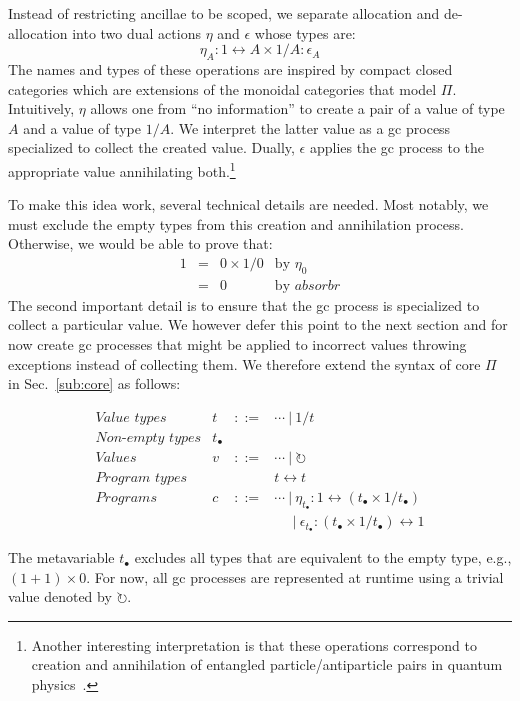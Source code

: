 \documentclass[sigplan,10pt,review,anonymous]{acmart}
\newcommand{\alt}{~|~}
\newcommand{\net}{t_\bullet}
\newcommand{\gcv}{\circlearrowright}
\newcommand{\oneover}[1]{1/#1}
\newcommand{\absorbr}{\mathit{absorbr}}
\begin{document}
Instead of restricting ancillae to be scoped, we separate allocation
and de-allocation into two dual actions $\eta$ and $\epsilon$ whose
types are:
\[
\eta_A : 1 \leftrightarrow A \times \oneover{A} : \epsilon_A
\]
The names and types of these operations are inspired by compact closed
categories which are extensions of the monoidal categories that model
$\Pi$. Intuitively, $\eta$ allows one from ``no information'' to
create a pair of a value of type $A$ and a value of type
$\oneover{A}$. We interpret the latter value as a gc process
specialized to collect the created value. Dually, $\epsilon$ applies
the gc process to the appropriate value annihilating
both.\footnote{Another interesting interpretation is that these
  operations correspond to creation and annihilation of entangled
  particle/antiparticle pairs in quantum
  physics~\cite{Panangaden2011}.}

To make this idea work, several technical details are needed. Most
notably, we must exclude the empty types from this creation and
annihilation process. Otherwise, we would be able to prove that:
\[\begin{array}{rcll}
1 &=& 0 \times 1/0 & \textrm{by~} \eta_0 \\
&=& 0 & \textrm{by~} \absorbr
\end{array}\]
The second important detail is to ensure that the gc process is
specialized to collect a particular value. We however defer this point to
the next section and for now create gc processes that might be applied
to incorrect values throwing exceptions instead of collecting them. We
therefore extend the syntax of core $\Pi$ in Sec.~\ref{sub:core} as
follows:

\[\begin{array}{lrcl}
\textit{Value types} & t &::=& \cdots \alt \oneover{t} \\
\textit{Non-empty types} & \net \\
\textit{Values}      & v &::=& \cdots \alt \gcv \\
\textit{Program types} &&& t \leftrightarrow t \\
\textit{Programs} & c &::=& \cdots \alt
   \eta_{\net} : 1 \leftrightarrow (\net \times \oneover{\net}) \\
   &&& ~~~~~\alt \epsilon_{\net} : (\net \times \oneover{\net}) \leftrightarrow 1 
\end{array}\]

The metavariable $\net$ excludes all types that are equivalent to the
empty type, e.g., $(1 + 1) \times 0$. For now, all gc processes are
represented at runtime using a trivial value denoted by $\gcv$. 
\end{document}
